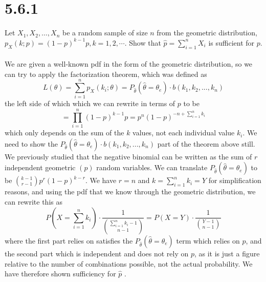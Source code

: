 \documentclass{article}
\begin{document}
{\section*{5.6.1}
Let \(X_1, X_2, \dots, X_n\) be a random sample of size \(n\) from the geometric distribution, \(p_X(k;p) = (1 - p)^{k-1}p, k = 1, 2, \cdots\). Show that \( \hat{p} = \sum_{i=1}^{n} X_i \) is sufficient for \(p\).
\\
\\
We are given a well-known pdf in the form of the geometric distribution, so we can try to apply the factorization theorem, which was defined as 
\[
L(\theta) = \sum_{i=1}^n p_X(k_i; \theta) = P_{\hat{\theta}}(\hat{\theta} = \theta_e) \cdot b(k_1, k_2, ..., k_n)
\]
the left side of which which we can rewrite in terms of \(p\) to be 
\[
= \prod_{i=1}^{n} (1 - p)^{k-1}p = p^n (1-p)^{-n + \sum_{i=1}^{n}k_i}
\]
which only depends on the sum of the \(k\) values, not each individual value \(k_i\). We need to show the \(P_{\hat{\theta}}(\hat{\theta} = \theta_e) \cdot b(k_1, k_2, ..., k_n)\) part of the theorem above still. We previously studied that the negative binomial can be written as the sum of \(r\) independent geometric \((p)\) random variables. We can translate \(P_{\hat{\theta}}(\hat{\theta} = \theta_e)\) to be \(\binom{k-1}{r-1}p^r(1-p)^{k-r}\). We have \(r = n\) and \(k = \sum_{i=1}^{n}k_i = Y\) for simplification reasons, and using the pdf that we know through the geometric distribution, we can rewrite this as 
\[
P(X = \sum_{i=1}^{n}k_i) \cdot \frac{1}{\binom{\sum_{i=1}^{n}k_i-1}{n-1} } = P(X = Y) \cdot \frac{1}{\binom{Y-1}{n-1} }
\]
where the first part relies on satisfies the \(P_{\hat{\theta}}(\hat{\theta} = \theta_e)\) term which relies on \(p\), and the second part which is independent and does not rely on \(p\), as it is just a figure relative to the number of combinations possible, not the actual probability. We have therefore shown sufficiency for \(\hat{p}\) . 

}
\end{document}
